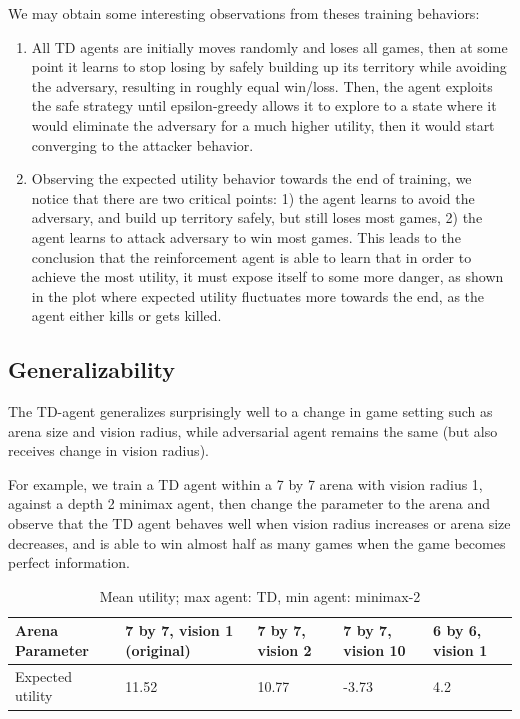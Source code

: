 \documentclass{article}
\begin{document}
We may obtain some interesting observations from theses training behaviors:

\begin{enumerate}
    \item 
    All TD agents are initially moves randomly and loses all games, then at some point it learns to stop losing by safely building up its territory while avoiding the adversary, resulting in roughly equal win/loss. Then, the agent exploits the safe strategy until epsilon-greedy allows it to explore to a state where it would eliminate the adversary for a much higher utility, then it would start converging to the attacker behavior.
    \item 
    Observing the expected utility behavior towards the end of training, we notice that there are two critical points: 1) the agent learns to avoid the adversary, and build up territory safely, but still loses most games, 2) the agent learns to attack adversary to win most games. This leads to the conclusion that the reinforcement agent is able to learn that in order to achieve the most utility, it must expose itself to some more danger, as shown in the plot where expected utility fluctuates more towards the end, as the agent either kills or gets killed. 
\end{enumerate}


\subsection{Generalizability}

The TD-agent generalizes surprisingly well to a change in game setting such as arena size and vision radius, while adversarial agent remains the same (but also receives change in vision radius).

For example, we train a TD agent within a 7 by 7 arena with vision radius 1, against a depth 2 minimax agent, then change the parameter to the arena and observe that the TD agent behaves well when vision radius increases or arena size decreases, and is able to win almost half as many games when the game becomes perfect information.

\begin{table}[H]
\centering
\caption{Mean utility; max agent: TD, min agent: minimax-2}
\begin{tabular}{l  l l l l}
\hline
Arena Parameter  & 7 by 7, vision 1 (original) & 7 by 7, vision 2 & 7 by 7, vision 10 & 6 by 6, vision 1 \\ \hline
Expected utility & 11.52                       & 10.77            & -3.73             & 4.2              \\ \hline
\end{tabular}
\end{table}
\end{document}
